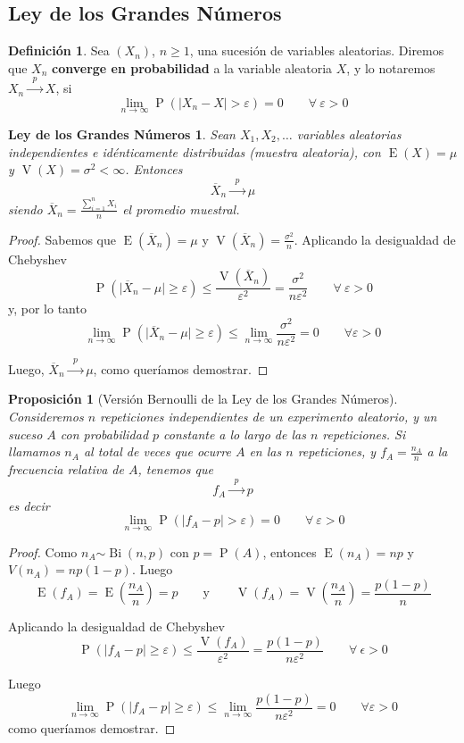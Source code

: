 \documentclass[11pt]{article}
\theoremstyle{plain}
\newtheorem*{pro}{Proposición}
\newtheorem*{lgn}{Ley de los Grandes Números}
\theoremstyle{definition}
\newtheorem*{defi}{Definición}
\theoremstyle{remark}
\newcommand{\deft}[1]{\textbf{#1}}  %
\newcommand{\proba}{\ensuremath{\operatorname{P}}}  %
\newcommand{\esp}[0]{\ensuremath{\operatorname{E}}}  %
\newcommand{\var}[0]{\ensuremath{\operatorname{V}}}  %
\newcommand{\foralle}{\ensuremath{\forall \ }}  %
\newcommand{\dist}[1]{\ensuremath{\sim \operatorname{#1}}}  %
\newcommand{\tiende}[1]{\ensuremath{\xrightarrow{\;\; #1 \;\;}}}  %
\begin{document}
  \subsection{Ley de los Grandes Números}
    \begin{defi}
      Sea $(X_n)$, $n \geq 1$, una sucesión de variables aleatorias. Diremos que $X_n$ \deft{converge en probabilidad} a la variable aleatoria $X$, y lo notaremos $X_n \tiende{p} X$, si
      \[ \lim_{n \to \infty} \proba(\vert X_n - X \vert > \varepsilon) = 0 \qquad \foralle \varepsilon > 0 \]
    \end{defi}

    \begin{lgn}
      Sean $X_1, X_2, \dots$ variables aleatorias independientes e idénticamente distribuidas (muestra aleatoria), con $\esp(X) = \mu$ y $\var(X) = \sigma^2 < \infty$. Entonces
      \[ \overline{X}_n \tiende{p} \mu \]
      siendo $ \overline{X}_n = \frac{\sum_{i=1}^n X_i}{n}$ el promedio muestral.
    \end{lgn}
    \begin{proof}
      Sabemos que $\esp(\overline{X}_n) = \mu$ y $\var(\overline{X}_n) = \frac{\sigma^2}{n}$. Aplicando la desigualdad de Chebyshev
      \[ \proba(\vert \overline{X}_n - \mu \vert \geq \varepsilon) \leq \frac{\var(\overline{X}_n)}{\varepsilon^2} = \frac{\sigma^2}{n \varepsilon^2} \qquad \foralle \varepsilon > 0 \]
      y, por lo tanto
      \[ \lim_{n \to \infty} \proba(\vert \overline{X}_n - \mu \vert \geq \varepsilon) \leq \lim_{n \to \infty} \frac{\sigma^2}{n \varepsilon^2} = 0 \qquad \forall \varepsilon > 0 \]

      Luego, $ \overline{X}_n \tiende{p} \mu$, como queríamos demostrar.
    \end{proof}

    \begin{pro}[Versión Bernoulli de la Ley de los Grandes Números]
      Consideremos $n$ repeticiones independientes de un experimento aleatorio, y un suceso $A$ con probabilidad $p$ constante a lo largo de las $n$ repeticiones. Si llamamos $n_A$ al total de veces que ocurre $A$ en las $n$ repeticiones, y $f_A = \frac{n_A}{n}$ a la frecuencia relativa de $A$, tenemos que
      \[ f_A \tiende{p} p \]
      es decir
      \[ \lim_{n \to \infty} \proba(\vert f_A - p \vert > \varepsilon) = 0 \qquad \foralle \varepsilon > 0 \]
    \end{pro}
    \begin{proof}
      Como $n_A \dist{Bi}(n,p)$ con $p = \proba(A)$, entonces $\esp(n_A) = n p$ y $V(n_A) = n p (1 - p)$. Luego
      \[ \esp(f_A) = \esp \left( \frac{n_A}{n} \right) = p \qquad \text{y} \qquad \var(f_A) = \var \left( \frac{n_A}{n} \right) = \frac{p (1 - p)}{n} \]

      Aplicando la desigualdad de Chebyshev
      \[ \proba(\vert f_A - p \vert \geq \varepsilon) \leq \frac{\var(f_A)}{\varepsilon^2} = \frac{p (1 - p)}{n \varepsilon^2} \qquad \foralle \epsilon > 0 \]

      Luego
      \[ \lim_{n \to \infty} \proba(\vert f_A - p \vert \geq \varepsilon) \leq \lim_{n \to \infty} \frac{p (1 - p)}{n \varepsilon^2} = 0 \qquad \forall \varepsilon > 0 \]
      como queríamos demostrar.
    \end{proof}
\end{document}
